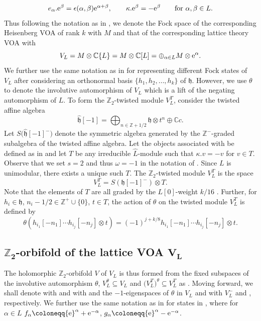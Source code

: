 \documentclass[pdftex]{sigma}
\numberwithin{equation}{section}
\theoremstyle{definition}
\begin{document}
\[e_{\alpha}.{\rm e}^{\beta}=\epsilon(\alpha,\beta){\rm e}^{\alpha+\beta},\qquad\kappa. {\rm e}^{\beta}=-{\rm e}^{\beta}\qquad \text{for} \ \alpha,\beta\in L.\]
Thus following the notation as in \cite{Mason20231-PointAlgebras}, we denote the Fock space of the corresponding Heisenberg VOA of rank $k$ with $M$ and that of the corresponding lattice theory VOA with
\[V_L= M\otimes \mathbb{C}\{L\}= M\otimes \mathbb{C}[L]=\oplus_{\alpha\in L}M\otimes {\rm e}^{\alpha}.\]
We further use the same notation as in \cite[Section 2.4]{Mason20231-PointAlgebras} for representing different Fock states of~$V_L$ after considering an orthonormal basis $\{h_1,h_2,\dots,h_k\}$ of $\mathfrak{h}$. However, we use $\theta$ to denote the involutive automorphism of $V_L$ which is a lift of the negating automorphism of $L$. To form the $\mathbb{Z}_2$-twisted module $V_L^T$, consider the twisted affine algebra
\[\hat{\mathfrak{h}}[-1]=\bigoplus_{n\in \mathbb{Z}+1/2}\mathfrak{h}\otimes t^n \oplus \mathbb{C}c.\]
Let $S\bigl(\hat{\mathfrak{h}}[-1]^-\bigr)$ denote the symmetric algebra generated by the $\mathbb{Z}^-$-graded subalgebra of the twisted affine algebra. Let the objects associated with  be defined as in \cite[equations (7.1.6)--(7.1.27)]{Frenkel1988VertexMonster} and let $T$ be any irreducible $\hat{L}$-module such that
$\kappa.v=-v$ for $v\in T$.
Observe that we set $s=2$ and thus $\omega=-1$ in the notation of \cite{Frenkel1988VertexMonster}. Since $L$ is unimodular, there exists a unique such $T$. The $\mathbb{Z}_2$-twisted module $V_L^T$ is the space
\[V_L^T=S(\mathfrak{h}[-1]^-)\otimes T.\]
Note that the elements of $T$ are all graded by the $L[0]$-weight $k/16$ \cite{Frenkel1988VertexMonster}.
Further, for $h_i\in \mathfrak{h}$, $n_i-1/2\in \mathbb{Z}^+\cup\{0\}$, $t\in T$, the action of $\theta$ on the twisted module $V_L^T$ is defined by
\[\theta(h_{i_1}[-n_1]\cdots h_{i_j}[-n_j]\otimes t)=(-1)^{j+k/8} h_{i_1}[-n_1]\cdots h_{i_j}[-n_j]\otimes t.\]

\subsection[Z\_2-orbifold of the lattice VOA V\_L]{$\boldsymbol{\mathbb{Z}_2}$-orbifold of the lattice VOA $\boldsymbol{V_L}$}

The holomorphic $\mathbb{Z}_2$-orbifold $V$ of $V_L$ is thus formed from the fixed subspaces of the involutive automorphism $\theta$, $V_L^{\theta}\subseteq V_L$ and $\bigl(V_L^T\bigr)^{\theta}\subseteq V_L^T$ as \cite{Dolan1990ConformalOperators, van2020Construction}
.
Moving forward, we shall denote  with  and  with  and the $-1$-eigenspaces of $\theta$ in $V_L$ and  with $V_L^-$ and , respectively. We further use the same notation as in \cite{Mason20231-PointAlgebras} for states in , where for $\alpha\in L$
$
f_{\alpha}\coloneqq {\rm e}^{\alpha}+{\rm e}^{-\alpha}$, $
g_{\alpha}\coloneqq {\rm e}^{\alpha}-{\rm e}^{-\alpha}$.
\end{document}
